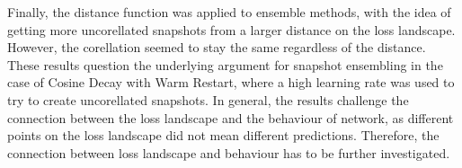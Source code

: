 Finally, the distance function was applied to ensemble methods, with the idea of
getting more uncorellated snapshots from a larger distance on the loss
landscape. However, the corellation seemed to stay the same regardless of the
distance. These results question the underlying argument for snapshot ensembling
in the case of Cosine Decay with Warm Restart, where a high learning rate was
used to try to create uncorellated snapshots. In general, the results challenge
the connection between the loss landscape and the behaviour of network, as
different points on the loss landscape did not mean different predictions.
Therefore, the connection between loss landscape and behaviour has to be further
investigated. 
